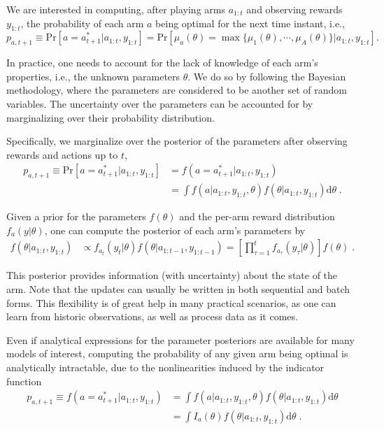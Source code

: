 \documentclass[10pt]{article}
\newcommand{\ie}{i.e., }
\begin{document}
We are interested in computing, after playing arms $a_{1:t}$ and observing rewards $y_{1:t}$, the probability of each arm $a$ being optimal for the next time instant, \ie
\begin{equation}
p_{a,t+1} \equiv \mathrm{Pr}\left[a=a_{t+1}^* \big| a_{1:t}, y_{1:t}\right]=\mathrm{Pr}\left[ \mu_{a}(\theta) = \max\{\mu_1(\theta), \cdots, \mu_A(\theta)\} \big| a_{1:t}, y_{1:t}\right] .
\end{equation}

In practice, one needs to account for the lack of knowledge of each arm's properties, \ie the unknown parameters $\theta$. We do so by following the Bayesian methodology, where the parameters are considered to be another set of random variables. The uncertainty over the parameters can be accounted for by marginalizing over their probability distribution.

Specifically, we marginalize over the posterior of the parameters after observing rewards and actions up to $t$,
\begin{equation}
\begin{split}
p_{a,t+1} \equiv \mathrm{Pr}\left[a=a_{t+1}^* \big| a_{1:t}, y_{1:t}\right]&=f(a=a^*_{t+1}|a_{1:t}, y_{1:t}) \\
&=\int f(a|a_{1:t}, y_{1:t}, \theta) f(\theta|a_{1:t}, y_{1:t}) \mathrm{d}\theta \;.
\end{split}
\label{eq:pr_arm_optimal_bayes}
\end{equation}

Given a prior for the parameters $f(\theta)$ and the per-arm reward distribution $f_{a}(y|\theta)$, one can compute the posterior of each arm's parameters by
\begin{equation}
\begin{split}
f(\theta|a_{1:t}, y_{1:t}) &\propto f_{a_t}(y_t | \theta)f(\theta | a_{1:t-1}, y_{1:t-1}) = \left[\prod_{\tau=1}^t f_{a_{\tau}}(y_{\tau}|\theta)\right] f(\theta) \; .
\end{split}
\label{eq:seq_param_posterior}
\end{equation}

This posterior provides information (with uncertainty) about the state of the arm. Note that the updates can usually be written in both sequential and batch forms. This flexibility is of great help in many practical scenarios, as one can learn from historic observations, as well as process data as it comes.

Even if analytical expressions for the parameter posteriors are available for many models of interest, computing the probability of any given arm being optimal is analytically intractable, due to the nonlinearities induced by the indicator function
\begin{equation}
\begin{split}
p_{a,t+1} \equiv f(a=a^*_{t+1}|a_{1:t}, y_{1:t})&=\int f(a|a_{1:t}, y_{1:t}, \theta) f(\theta|a_{1:t}, y_{1:t}) \mathrm{d}\theta \\
&= \int I_a(\theta) f(\theta|a_{1:t}, y_{1:t}) \mathrm{d}\theta \; .
\label{eq:pr_arm_optimal_bayes_indicator}
\end{split}
\end{equation}
\end{document}
